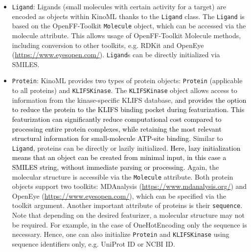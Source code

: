 \documentclass[9pt,lessons, pubversion]{livecoms}
\newcommand{\revision}[1]{\textcolor{black}{#1}}
\begin{document}
\begin{itemize}
    \item \texttt{Ligand}: Ligands (small molecules with certain activity for a target) are encoded as objects within KinoML thanks to the \texttt{Ligand} class. The \texttt{Ligand} is based on the OpenFF-Toolkit \cite{boothroyd2023development} \texttt{Molecule} object, which can be accessed via the molecule attribute. This allows usage of OpenFF-Toolkit Molecule methods, including conversion to other toolkits, e.g. RDKit \cite{landrum2013rdkit} and OpenEye (\url{https://www.eyesopen.com/}). \texttt{Ligand}s can be directly initialized via SMILES. %
    \item \texttt{Protein}: KinoML provides two types of protein objects: \texttt{Protein} (applicable to all proteins) and \texttt{KLIFS\-Kinase}. The \texttt{KLIFS\-Kinase} object allows access to information from the kinase-specific KLIFS database, \revision{and  provides the option to reduce the protein to the KLIFS binding pocket during featurization. This featurization can significantly reduce computational cost compared to processing entire protein complexes, while retaining the most relevant structural information for small-molecule ATP-site binding}. Similar to \texttt{Ligand}, proteins can be directly or lazily initialized. \revision{Here, lazy initialization means that an object can be created from minimal input, in this case a SMILES string, without immediate parsing or processing.} Again, the molecular structure is accessible via the \texttt{Molecule} attribute. Both protein objects support two toolkits: MDAnalysis (\url{https://www.mdanalysis.org/}) and OpenEye (\url{https://www.eyesopen.com/}), which can be specified via the toolkit argument.  Another important attribute of proteins is their \texttt{sequence}. Note that depending on the desired featurizer, a molecular structure may not be required. For example, in the case of OneHotEncoding only the sequence is necessary. Hence, one can also initialize \texttt{Protein} and \texttt{KLIFSKinase} using sequence identifiers only, e.g. UniProt ID or NCBI ID. 
\end{itemize}
    
\end{document}
